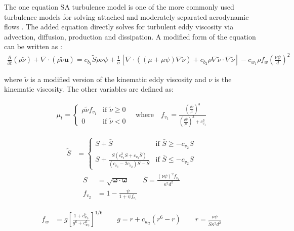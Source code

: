 The one equation SA turbulence model is one of the more commonly used turbulence models for solving attached and moderately separated aerodynamic flows \cite{spalart1992one}. The added equation directly solves for turbulent eddy viscosity via advection, diffusion, production and dissipation. A modified form of the equation can be written as \cite{burgess2012robust,oliver2008high,moro2011navier}:
\begin{align}
	\frac{\partial}{\partial t}(\rho\tilde\nu) + \nabla\cdot(\rho\tilde\nu\boldsymbol{u}) = c_{b_1}\tilde S \rho\nu\psi + \frac{1}{\sigma}\left[\nabla\cdot((\mu + \mu\psi)\nabla\tilde\nu) + c_{b_2}\rho\nabla\tilde\nu\cdot\nabla\tilde\nu\right] - c_{w_1}\rho f_w \left(\frac{\nu\psi}{d}\right)^2
\end{align}

where $\tilde\nu$ is a modified version of the kinematic eddy viscosity and $\nu$ is the kinematic viscosity. The other variables are defined as:

\begin{align}
	 \mu_t =
	  \begin{cases}
	   \rho\tilde\nu f_{v_1} & \text{if } \tilde\nu \ge 0 \\
	   0       & \text{if } \tilde\nu < 0
	  \end{cases}
	  \quad \mbox{where} \quad f_{v_1} = \frac{\left(\frac{\rho\tilde\nu}{\mu}\right)^3}{\left(\frac{\rho\tilde\nu}{\mu}\right)^3 + c_{v_1}^3}
\end{align}

\begin{align}
	\tilde S &=
	\begin{cases}
	   S + \bar S & \text{if } \bar S \ge -c_{v_2}S \\
	   S + \frac{S(c_{v_2}^2 S + c_{v_3}\bar S)}{(c_{v_3} - 2c_{v_2})S - \bar S} & \text{if } \bar S \le -c_{v_2}S
	\end{cases}
\end{align}
\begin{align}
	S &= \sqrt{\boldsymbol{\omega}\cdot\boldsymbol{\omega}}
	\qquad \bar S = \frac{(\nu\psi)^2 f_{v_2}}{\kappa^2 d^2} \\
	f_{v_2} &= 1 - \frac{\psi}{1 + \psi f_{v_1}}
\end{align}

\begin{align}
	f_w &= g\left[\frac{1 + c_{w_3}^6}{g^6 + c_{w_3}^6}\right]^{1/6} 
	\qquad g = r + c_{w_2}(r^6 - r) 
	\qquad r = \frac{\nu\psi}{\tilde S \kappa^2 d^2}
\end{align}

